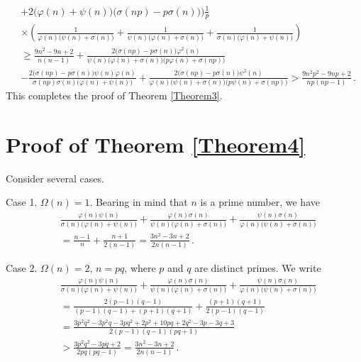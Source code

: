 \documentclass[12pt]{article}
\begin{document}
\begin{align*}
&+2\big(\varphi(n)+\psi(n)\big)\big(\sigma(np)-p\sigma(n)\big)\bigg)\frac{1}{p}\\
&\times\left(\frac{1}{\varphi(n)\big(\psi(n)+\sigma(n)\big)}+\frac{1}{\psi(n)\big(\varphi(n)+\sigma(n)\big)}+\frac{1}{\sigma(n)\big(\varphi(n)+\psi(n)\big)}\right)\\
&\geq\frac{9n^2-9n+2}{n(n-1)}+\frac{2\big(\sigma(np)-p\sigma(n)\big)\varphi^2(n)}{\psi(n)\big(\varphi(n)+\sigma(n)\big)\big(p\varphi(n)+\sigma(np)\big)}\\
&-\frac{2\big(\sigma(np)-p\sigma(n)\big)\psi(n)\varphi(n)}{\sigma(np)\sigma(n)\big(\varphi(n)+\psi(n)\big)}
+\frac{2\big(\sigma(np)-p\sigma(n)\big)\psi^2(n)}{\varphi(n)\big(\psi(n)+\sigma(n)\big)\big(p\psi(n)+\sigma(np)\big)}
>\frac{9n^2p^2-9np+2}{np(np-1)}\,.
\end{align*}
This completes the proof of Theorem \ref{Theorem3}.


\section{Proof of Theorem \ref{Theorem4}}

Consider several cases.

Case 1. \; $\Omega(n)=1$. Bearing in mind that $n$ is a prime number, we have
\begin{align*}
&\frac{\varphi(n)\psi(n)}{\sigma(n)\big(\varphi(n)+\psi(n)\big)}+\frac{\varphi(n)\sigma(n)}{\psi(n)\big(\varphi(n)+\sigma(n)\big)}+\frac{\psi(n)\sigma(n)}{\varphi(n)\big(\psi(n)+\sigma(n)\big)}\\
&=\frac{n-1}{n}+\frac{n+1}{2(n-1)}=\frac{3n^2-3n+2}{2n(n-1)}\,.
\end{align*}

Case 2. \; $\Omega(n)=2$, $n=pq$, where $p$ and $q$ are distinct primes. We write
\begin{align*}
&\frac{\varphi(n)\psi(n)}{\sigma(n)\big(\varphi(n)+\psi(n)\big)}+\frac{\varphi(n)\sigma(n)}{\psi(n)\big(\varphi(n)+\sigma(n)\big)}+\frac{\psi(n)\sigma(n)}{\varphi(n)\big(\psi(n)+\sigma(n)\big)}\\
&=\frac{2(p-1)(q-1)}{(p-1)(q-1)+(p+1)(q+1)}+\frac{(p+1)(q+1)}{2(p-1)(q-1)}\\ 
&=\frac{3p^2q^2-3p^2q-3pq^2+2p^2+10pq+2q^2-3p-3q+3}{2(p-1)(q-1)(pq+1)}\\
&>\frac{3p^2q^2-3pq+2}{2pq(pq-1)}=\frac{3n^2-3n+2}{2n(n-1)}\,.
\end{align*}
\end{document}
